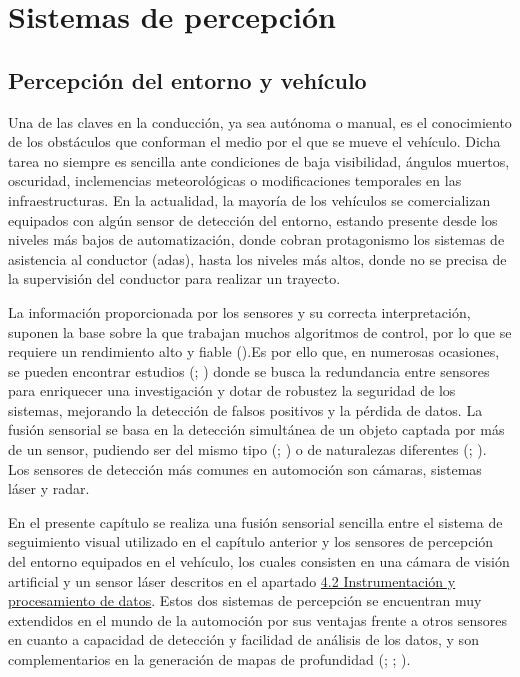 \section{Sistemas de percepción}\label{41}

\subsection{Percepción del entorno y vehículo}\label{411}

Una de las claves en la conducción, ya sea autónoma o manual, es el conocimiento de los obstáculos que conforman el medio por el que se mueve el vehículo. Dicha tarea no siempre es sencilla ante condiciones de baja visibilidad, ángulos muertos, oscuridad, inclemencias meteorológicas o modificaciones temporales en las infraestructuras. En la actualidad, la mayoría de los vehículos se comercializan equipados con algún sensor de detección del entorno, estando presente desde los niveles más bajos de automatización, donde cobran protagonismo los sistemas de asistencia al conductor (\gls{adas}), hasta los niveles más altos, donde no se precisa de la supervisión del conductor para realizar un trayecto. 

La información proporcionada por los sensores y su correcta interpretación, suponen la base sobre la que trabajan muchos algoritmos de control, por lo que se requiere un rendimiento alto y fiable (\cite{yeong}).Es por ello que, en numerosas ocasiones, se pueden encontrar estudios (\cite{kim}; \cite{li21b}) donde se busca la redundancia entre sensores para enriquecer una investigación y dotar de robustez la seguridad de los sistemas, mejorando la detección de falsos positivos y la pérdida de datos. La fusión sensorial se basa en la detección simultánea de un objeto captada por más de un sensor, pudiendo ser del mismo tipo (\cite{fan}; \cite{kemsaram}) o de naturalezas diferentes (\cite{gehrig}; \cite{caesar}). Los sensores de detección más comunes en automoción son cámaras, sistemas láser y radar. 

En el presente capítulo se realiza una fusión sensorial sencilla entre el sistema de seguimiento visual utilizado en el capítulo anterior y los sensores de percepción del entorno equipados en el vehículo, los cuales consisten en una cámara de visión artificial y un sensor láser descritos en el apartado \hyperref[42]{4.2 Instrumentación y procesamiento de datos}. Estos dos sistemas de percepción se encuentran muy extendidos en el mundo de la automoción por sus ventajas frente a otros sensores en cuanto a capacidad de detección y facilidad de análisis de los datos, y son complementarios en la generación de mapas de profundidad (\cite{berrio}; \cite{mendez}; \cite{bai}).

